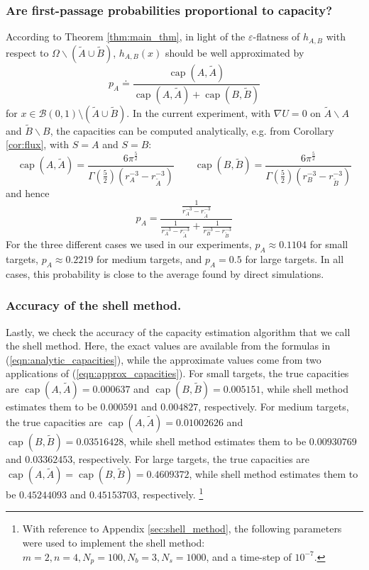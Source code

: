 \documentclass[12pt, nofootinbib,english, amsmath, amssymb, aps, priprint, graphicx,floatfix]{revtex4-1}
\theoremstyle{plain}
\theoremstyle{definition}
\theoremstyle{plain}
\newcommand{\capac}[2]{\ensuremath{\operatorname{cap}}(#1,#2)}
\newcommand{\tA}{{\tilde A}}
\newcommand{\tB}{{\tilde B}}
\begin{document}
\subsubsection{Are first-passage probabilities proportional to capacity?}
\label{sec:toy_capacity}
According to Theorem \ref{thm:main_thm},
in light of the $\varepsilon$-flatness of 
$h_{A,B}$  with respect to $\Omega\backslash(\tA\cup\tB)$, 
$h_{A,B}(x)$ should be well approximated by 
\begin{equation}
\label{eqn:capacity_ratio}
p_A \doteq \frac{\capac{A}{\tA}}{\capac{A}{\tA}+\capac{B}{\tB}}
\end{equation}
for $x\in 
\mathcal{B}(0, 1) \setminus (\tilde{A} \cup \tilde{B})$. 
In the current experiment, with $\nabla U=0$ on 
$\tA\backslash A$ and $\tB\backslash B$, the capacities can be computed analytically, e.g. from Corollary \ref{cor:flux}, 
with $S=A$ and $S=B$:
\begin{equation}
\label{eqn:analytic_capacities}
\capac{A}{\tA}  =
\frac{6\pi^{\frac{5}{2}}}
{\Gamma(\frac{5}{2})(r_A^{-3} - r_\tA^{-3})}  \qquad
\capac{B}{\tB}  =
\frac{6\pi^{\frac{5}{2}}}
{\Gamma(\frac{5}{2})(r_B^{-3} - r_\tB^{-3})}
\end{equation}
and hence 
\begin{equation*}
p_A = \frac{\frac{1}{r_A^{-3} - r_{\tilde{A}}^{-3}}}{\frac{1}{r_A^{-3} - r_{\tilde{A}}^{-3}} + \frac{1}{r_B^{-3} - r_{\tilde{B}}^{-3}}}
\end{equation*}
For the three different cases we used in our experiments, $p_A \approx 0.1104$ for small targets, $p_A \approx 0.2219$ for medium targets, and $p_A = 0.5$ for large targets.
In all cases, this probability is close to the average found by direct simulations. 

\subsubsection{Accuracy of the shell method.}
\label{sec:toy_shell}
Lastly, we check the accuracy of the capacity estimation algorithm that we call the shell method. Here, the exact values are available from the formulas in (\ref{eqn:analytic_capacities}), while the approximate values come from two applications of (\ref{eqn:approx_capacities}). For small targets, the true capacities are $\capac{A}{\tA}=0.000637$ and $\capac{B}{\tB}=0.005151$, while shell method estimates them to be $0.000591$ and $0.004827$, respectively. For medium targets, the true capacities are $\capac{A}{\tA}=0.01002626$ and $\capac{B}{\tB}=0.03516428$, while shell method estimates them to be $0.00930769$ and $0.03362453$, respectively. For large targets, the true capacities are $\capac{A}{\tA}=\capac{B}{\tB}=0.4609372$, while shell method estimates them to be $0.45244093 $ and $0.45153703$, respectively. \footnote{With reference to Appendix \ref{sec:shell_method}, the following parameters were used to implement the shell method: $m = 2, n = 4, N_p = 100, N_b = 3, N_s = 1000$, and a time-step of $10^{-7}$.}
\end{document}
